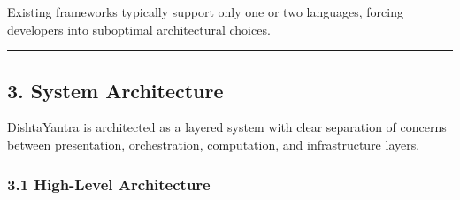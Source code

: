 \documentclass[
]{article}
\begin{document}
Existing frameworks typically support only one or two languages, forcing
developers into suboptimal architectural choices.

\begin{center}\rule{0.5\linewidth}{0.5pt}\end{center}

\hypertarget{system-architecture}{%
\subsection{3. System Architecture}\label{system-architecture}}

DishtaYantra is architected as a layered system with clear separation of
concerns between presentation, orchestration, computation, and
infrastructure layers.

\hypertarget{high-level-architecture}{%
\subsubsection{3.1 High-Level
Architecture}\label{high-level-architecture}}
\end{document}
